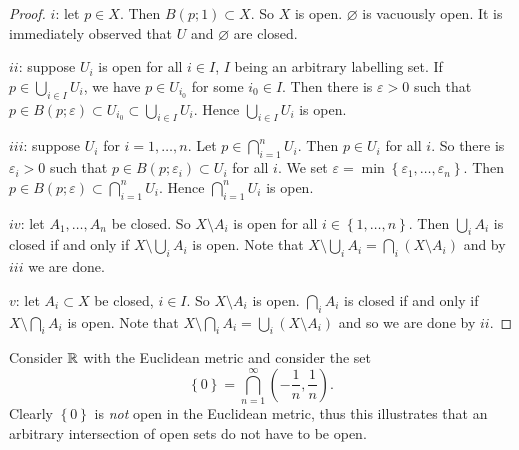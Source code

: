 \begin{proof}
	$i$: let $p \in X$.
	Then $B(p;1) \subset X$.
	So $X$ is open.
	$\varnothing$ is vacuously open.
	It is immediately observed that $U$ and $\varnothing$ are closed.
	
	$ii$: suppose $U_i$ is open for all $i \in I$, $I$ being an arbitrary
	labelling set.
	If $p \in \bigcup_{i \in I} U_i$, we have $p \in U_{i_0}$ for some
	$i_0 \in I$.
	Then there is $\varepsilon > 0$ such that 
	$p \in B(p; \varepsilon) \subset U_{i_0} \subset \bigcup_{i \in I} U_i$.
	Hence $\bigcup_{i \in I} U_i$ is open.
	
	$iii$: suppose $U_i$ for $i = 1, \ldots, n$.
	Let $p \in \bigcap_{i=1}^n U_i$.
	Then $p \in U_i$ for all $i$.
	So there is $\varepsilon_i > 0$ such that 
	$p \in B(p; \varepsilon_i) \subset U_i$ for all $i$.
	We set 
	$\varepsilon = \min\left\{ \varepsilon_1, \ldots, \varepsilon_n \right\}$.
	Then $p \in B(p; \varepsilon) \subset \bigcap_{i=1}^n U_i$.
	Hence $\bigcap_{i=1}^n U_i$ is open.

	$iv$: let $A_1, \ldots, A_n$ be closed.
	So $X \setminus A_i$ is open for all $i \in \left\{ 1,\ldots,n \right\}$.
	Then $\bigcup_{i} A_i$ is closed if and only if $X \setminus \bigcup_i A_i$ 
	is open.
	Note that
	$X \setminus \bigcup_i A_i = \bigcap_i \left( X \setminus A_i \right)$
	and by $iii$ we are done.

	$v$: let $A_i \subset X$ be closed, $i \in I$.
	So $X \setminus A_i$ is open.
	$\bigcap_i A_i$ is closed if and only if $X \setminus \bigcap_i A_i$ is open.
	Note that
	$X \setminus \bigcap_i A_i = \bigcup_i \left( X \setminus A_i \right)$
	and so we are done by $ii$.
\end{proof}

\begin{example}[]
	Consider $\mathbb{R}$ with the Euclidean metric and consider the set
	\[
		\left\{ 0 \right\}
		= \bigcap_{n=1}^\infty \left( -\frac1n, \frac1n \right).
	\]
	Clearly $\left\{ 0 \right\}$ is \emph{not} open in the Euclidean metric,
	thus this illustrates that an arbitrary intersection of open sets do not have
	to be open.
\end{example}
